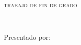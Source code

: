 
\begin{titlepage}
  \AddToShipoutPicture*{\BackgroundPic}

  \begin{addmargin}[2.2cm]{0cm}
  \begin{flushleft}
    \Large  
    \hfill\vfil

    \textsf{\miFacultad}
    \vfill\vfill

    {\huge\textsf\miGrado} \vfill


    \textsc{trabajo de fin de grado}

    \begingroup
    \Huge{\miTitulo} \\ \bigskip
    \endgroup

    \vfill\vfill\vfill\vfill

    \textsf{\normalsize{Presentado por:}}\\
    {\Large\textrm{\miNombre}}

    \vfill
    \textsf{\miCurso}
  \end{flushleft}  
  \end{addmargin}       

\end{titlepage}   
\cleardoublepage
\endinput
